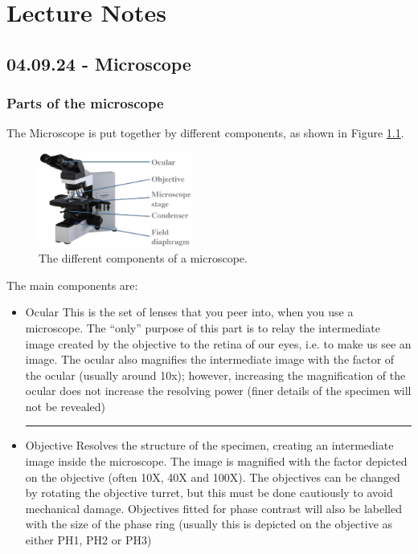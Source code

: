 \chapter{Lecture Notes}
\setlength{\headheight}{12.71342pt}
\addtolength{\topmargin}{-0.71342pt}

\section{04.09.24 - Microscope}

\subsection{Parts of the microscope}
The Microscope is put together by different components, as shown in Figure \ref{fig:MicroscopeComponents}. 

\begin{figure}[h]
    \centering
    \includegraphics[width=0.45\textwidth]{Figures/MicroscopeComponents.png}
    \caption{The different components of a microscope.}
    \label{fig:MicroscopeComponents}
\end{figure}

The main components are: 
\begin{highlight}
    \begin{itemize}

        \item Ocular
        \subitem This is the set of lenses that you peer into, when you use a microscope. The “only” purpose of this part is to relay the intermediate image created by the objective to the retina of our eyes, i.e. to make us see an image. The ocular also magnifies the intermediate image with the factor of the ocular (usually around 10x); however, increasing the magnification of the ocular does not increase the resolving power (finer details of the specimen will not be 
        revealed)

        \vspace{5pt}\hrule\vspace{5pt}

        \item Objective
        \subitem Resolves the structure of the specimen, creating an intermediate image inside the microscope. The image is magnified with the factor depicted on the objective (often 10X, 40X and 100X). The objectives can be changed by rotating the objective turret, but this must be done cautiously to avoid mechanical damage. Objectives fitted for phase contrast will also be labelled with the size of the phase ring (usually this is depicted on the objective as either PH1, PH2 or PH3)

\end{itemize}
\end{highlight}

